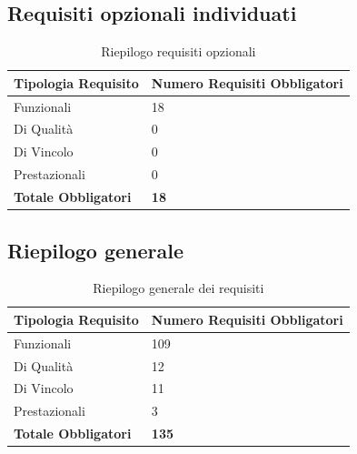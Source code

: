 \subsection{Requisiti opzionali individuati}
\begin{table}[htbp]
	\centering
	\caption{Riepilogo requisiti opzionali}
	\label{tab:riepilogo-opzionali}
	\renewcommand{\arraystretch}{1.3}
	\small
	\begin{tabularx}{0.8\textwidth}{|p{4.5cm}|X|}
		\hline
		\rowcolor[gray]{0.88}
		\textbf{Tipologia Requisito} & \textbf{Numero Requisiti Obbligatori} \\
		\hline
		Funzionali & 18 \\ \hline
		Di Qualit\`a & 0 \\ \hline
		Di Vincolo & 0 \\ \hline
		Prestazionali & 0 \\ \hline
		\textbf{Totale Obbligatori} & \textbf{18} \\ \hline
	\end{tabularx}
\end{table}

\newpage
\subsection{Riepilogo generale}
\begin{table}[htbp]
	\centering
	\caption{Riepilogo generale dei requisiti}
	\label{tab:riepilogo-generale}
	\renewcommand{\arraystretch}{1.3}
	\small
	\begin{tabularx}{0.8\textwidth}{|p{4.5cm}|X|}
		\hline
		\rowcolor[gray]{0.88}
		\textbf{Tipologia Requisito} & \textbf{Numero Requisiti Obbligatori} \\
		\hline
		Funzionali & 109 \\ \hline
		Di Qualit\`a & 12 \\ \hline
		Di Vincolo & 11 \\ \hline
		Prestazionali & 3 \\ \hline
		\textbf{Totale Obbligatori} & \textbf{135} \\ \hline
	\end{tabularx}
\end{table}